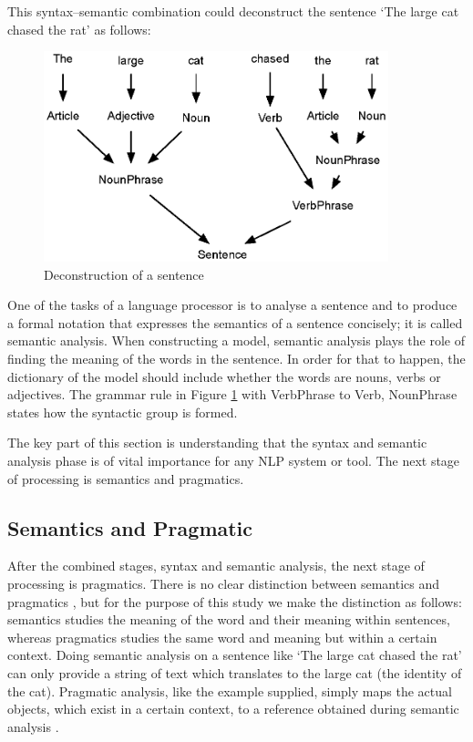 This syntax–semantic combination could deconstruct the sentence ‘The large cat chased the rat’ as follows:

\begin{figure}[htbp]
\centering
\includegraphics[width=10cm]{./figures/sen.eps}
\caption{Deconstruction of a sentence}
\label{fig:sentence}
\end{figure}

One of the tasks of a language processor is to analyse a sentence and to produce a formal notation that expresses the semantics of a sentence concisely; it is called semantic analysis.
When constructing a model, semantic analysis plays the role of finding the meaning of the words in the sentence. In order for that to happen, the dictionary of the model should include whether the words are nouns, verbs
or adjectives. The grammar rule in Figure \ref{fig:sentence} with VerbPhrase to Verb, NounPhrase states how the syntactic group is formed.

The key part of this section is understanding that the syntax and semantic analysis phase is of vital importance for any NLP system or tool.
The next stage of processing is semantics and pragmatics.

\subsection{Semantics and Pragmatic}

After the combined stages, syntax and semantic analysis, the next stage of processing is pragmatics. There is no clear distinction between semantics and pragmatics \cite{Stern2004}, but for the purpose of this study we make the distinction as follows: semantics studies the meaning of the word and their meaning within sentences, whereas pragmatics studies the same word and meaning but within a certain context. Doing semantic analysis on a sentence like ‘The large cat chased the rat’ can only provide a string of text which translates to the large cat (the identity of the cat). Pragmatic analysis, like the example supplied, simply maps the actual objects, which exist in a certain context, to a reference obtained during semantic analysis \cite{russell2016artificial}.

